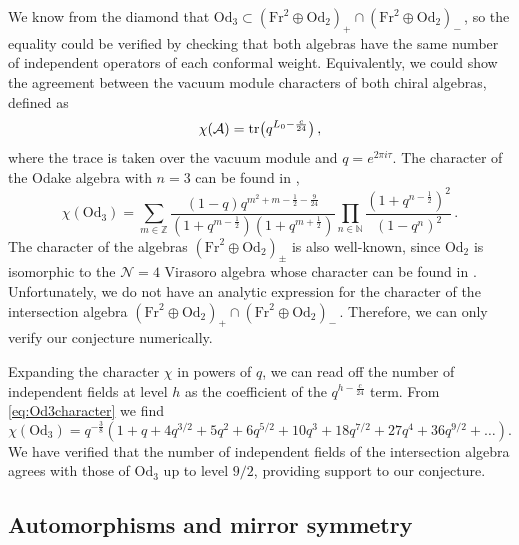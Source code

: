 \documentclass{pspum-l}
\theoremstyle{definition}
\theoremstyle{remark}
\numberwithin{equation}{section}
\begin{document}
We know from the diamond that $\text{Od}_3\subset \left( \text{Fr}^2\oplus \text{Od}_2 \right)_+ \cap\left( \text{Fr}^2\oplus \text{Od}_2 \right)_-\,$, so the equality could be verified by checking that both algebras have the same number of independent operators of each conformal weight. Equivalently, we could show the agreement between the vacuum module characters of both chiral algebras, defined as
\begin{equation}
    \chi(\mathcal{A})=\tr(q^{L_0-\frac{c}{24}}) \, ,
\end{equation}
where the trace is taken over the vacuum module and $q=e^{2\pi i\tau}$. The character of the Odake algebra with $n=3$ can be found in \cite{Odake:1989dm},
\begin{equation}
\label{eq:Od3character}
    \chi(\text{Od}_3)=\sum_{m\in\mathbb{Z}} \frac{\left(1-q\right)  q^{m^2+m-\frac{1}{2}-\frac{9}{24}}}{\left( 1+q^{m-\frac{1}{2}} \right)\left( 1+q^{m+\frac{1}{2}} \right)} \prod_{n\in\mathbb{N}}\frac{\left( 1+q^{n-\frac{1}{2}} \right)^2}{\left( 1-q^n \right)^2} \, .
\end{equation}
The character of the algebras $\left( \text{Fr}^2\oplus \text{Od}_2 \right)_\pm$ is also well-known, since $\text{Od}_2$ is isomorphic to the $\mathcal{N}=4$ Virasoro algebra whose character can be found in \cite{Eguchi:1987wf}. Unfortunately, we do not have an analytic expression for the character of the intersection algebra $\left( \text{Fr}^2\oplus \text{Od}_2 \right)_+ \cap\left( \text{Fr}^2\oplus \text{Od}_2 \right)_-\, $. Therefore, we can only verify our conjecture numerically.

Expanding the character $\chi$ in powers of $q$, we can read off the number of independent fields at level $h$ as the coefficient of the $q^{h-\frac{c}{24}}$ term. From \eqref{eq:Od3character} we find
\begin{equation}
    \chi(\text{Od}_3)=q^{-\frac{3}{8}}\left( 1 + q + 4 q^{3/2} + 5 q^2 + 6 q^{5/2} +  10 q^3 + 18 q^{7/2} + 27 q^4 + 36 q^{9/2} + \dots  \right).
\end{equation}
We have verified that the number of independent fields of the intersection algebra agrees with those of $\text{Od}_3$ up to level $9/2$, providing support to our conjecture.



\subsection{Automorphisms and mirror symmetry}
\end{document}
